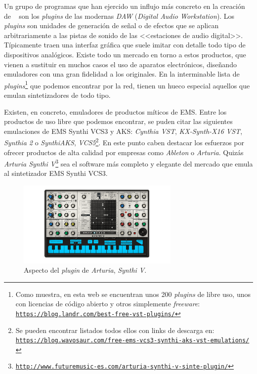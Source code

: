 Un grupo de programas que han ejercido un influjo más concreto en la creación de \appName~ son los \textit{plugins} de las modernas \textit{DAW} (\textit{Digital Audio Workstation}). Los \textit{plugins} son unidades de generación de señal o de efectos que se aplican arbitrariamente a las pistas de sonido de las <<estaciones de audio digital>>. Típicamente traen una interfaz gráfica que suele imitar con detalle todo tipo de dispositivos analógicos. Existe todo un mercado en torno a estos productos, que vienen a sustituir en muchos casos el uso de aparatos electrónicos, diseñando emuladores con una gran fidelidad a los originales. En la interminable lista de \textit{plugins}\footnote{Como muestra, en esta web se encuentran unos 200 \textit{plugins} de libre uso, unos con licencias de código abierto y otros simplemente \textit{freeware}: \href{https://blog.landr.com/best-free-vst-plugins/}{\texttt{https://blog.landr.com/best-free-vst-plugins/}}} que podemos encontrar por la red, tienen un hueco especial aquellos que emulan sintetizadores de todo tipo. 

Existen, en concreto, emuladores de productos míticos de EMS. Entre los productos de uso libre que podemos encontrar, se puden citar las siguientes emulaciones de EMS Synthi VCS3 y AKS: \textit{Cynthia VST}, \textit{KX-Synth-X16 VST}, \textit{Synthia 2} o \textit{SynthiAKS}, \textit{VCS5}\footnote{Se pueden encontrar listados todos ellos con links de descarga en: \href{https://blog.wavosaur.com/free-ems-vcs3-synthi-aks-vst-emulations/}{\texttt{https://blog.wavosaur.com/free-ems-vcs3-synthi-aks-vst-emulations/}}}. En este punto caben destacar los esfuerzos por ofrecer productos de alta calidad por empresas como \textit{Ableton} o \textit{Arturia}. Quizás \textit{Arturia Synthi V}\footnote{\href{http://www.futuremusic-es.com/arturia-synthi-v-sinte-plugin/}{\texttt{http://www.futuremusic-es.com/arturia-synthi-v-sinte-plugin/}}} sea el software más completo y elegante del mercado que emula al sintetizador EMS Synthi VCS3.

\begin{figure}
	\centering
	\includegraphics[width=0.7\textwidth]{./synthi_v_arturia}
	\caption[\textit{Arturia Synthi V}]{Aspecto del \textit{plugin} de \textit{Arturia}, \textit{Synthi V}.}
	\label{fig:synthi_v_arturia}
\end{figure}


